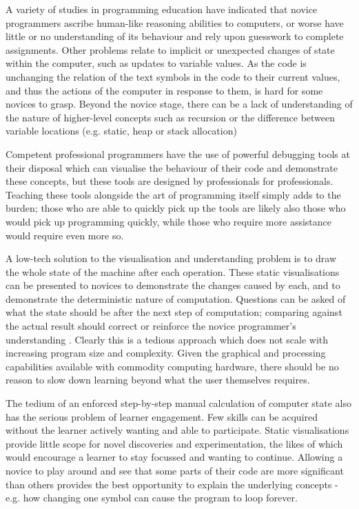 A variety of studies in programming education have indicated that novice programmers ascribe human-like reasoning abilities to computers\cite{ragonis2005long}, or worse have little or no understanding of its behaviour and rely upon guesswork to complete assignments. Other problems relate to implicit or unexpected changes of state within the computer, such as updates to variable values. As the code is unchanging the relation of the text symbols in the code to their current values, and thus the actions of the computer in response to them, is hard for some novices to grasp. Beyond the novice stage, there can be a lack of understanding of the nature of higher-level concepts such as recursion or the difference between variable locations (e.g. static, heap or stack allocation) \cite{learnerMisconceptions}

Competent professional programmers have the use of powerful debugging tools at their disposal which can visualise the behaviour of their code and demonstrate these concepts, but these tools are designed by professionals for professionals. Teaching these tools alongside the art of programming itself simply adds to the burden; those who are able to quickly pick up the tools are likely also those who would pick up programming quickly, while those who require more assistance would require even more so.

A low-tech solution to the visualisation and understanding problem is to draw the whole state of the machine after each operation. These static visualisations can be presented to novices to demonstrate the changes caused by each, and to demonstrate the deterministic nature of computation. Questions can be asked of what the state should be after the next step of computation; comparing against the actual result should correct or reinforce the novice programmer's understanding \cite{1612204}. Clearly this is a tedious approach which does not scale with increasing program size and complexity. Given the graphical and processing capabilities available with commodity computing hardware, there should be no reason to slow down learning beyond what the user themselves requires.

The tedium of an enforced step-by-step manual calculation of computer state also has the serious problem of learner engagement. Few skills can be acquired without the learner actively wanting and able to participate. Static visualisations provide little scope for novel discoveries and experimentation, the likes of which would encourage a learner to stay focussed and wanting to continue. Allowing a novice to play around and see that some parts of their code are more significant than others provides the best opportunity to explain the underlying concepts - e.g. how changing one symbol can cause the program to loop forever.

